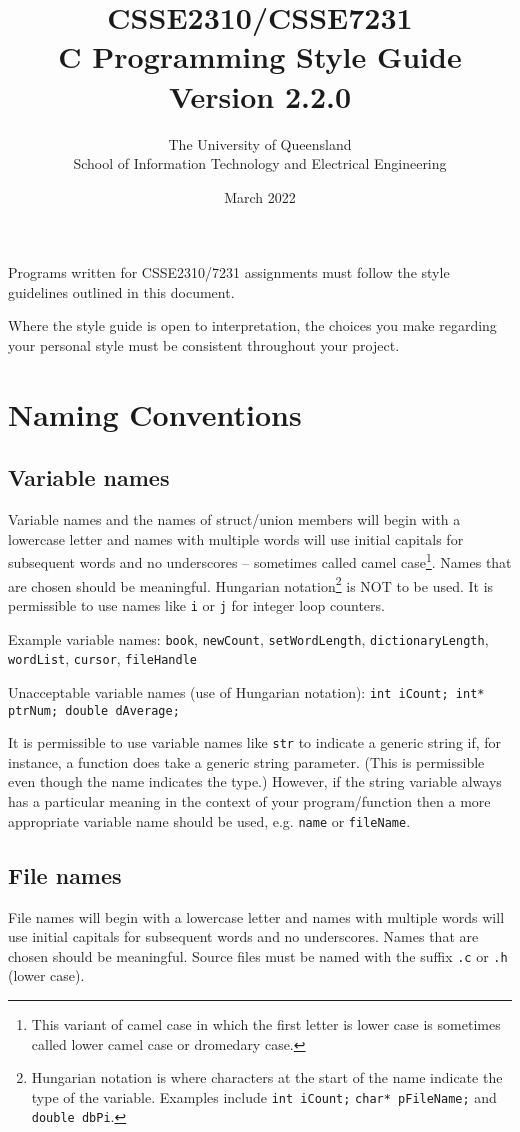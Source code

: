 \documentclass{article}
\title{CSSE2310/CSSE7231\\C Programming Style Guide\\Version 2.2.0}
\author{The University of Queensland\\School of Information Technology and Electrical Engineering}
\date{March 2022}
\begin{document}
\maketitle

Programs written for CSSE2310/7231 assignments must follow the style guidelines outlined in this document.

Where the style guide is open to interpretation, the choices you make regarding your personal style 
must be consistent throughout your project.

\section{Naming Conventions}
\subsection{Variable names}
\label{sec:naming-variable}
Variable names and the names of struct/union members will begin with a lowercase letter and names with multiple words 
will use initial capitals for subsequent words and no underscores -- sometimes called camel case\footnote{This variant of camel case 
in which the first letter is lower case is sometimes called lower camel case or dromedary case.}. 
Names that are chosen should be meaningful. Hungarian notation\footnote{Hungarian notation is where characters at the start of 
the name indicate the type of the variable. Examples include \texttt{int iCount;} \texttt{char* pFileName;} and
\texttt{double dbPi}.}
 is NOT to be used.
It is permissible to use names like \texttt{i} or \texttt{j} for integer loop counters.

Example variable names: \texttt{book}, \texttt{newCount}, \texttt{setWordLength}, \texttt{dictionaryLength}, 
\texttt{wordList}, \texttt{cursor}, \texttt{fileHandle}

Unacceptable variable names (use of Hungarian notation): \texttt{int iCount; int* ptrNum; double dAverage;}

It is permissible to use variable names like \texttt{str} to indicate a generic string if, for instance, a function does take a generic
string parameter. (This is permissible even though the name indicates the type.) However, if the string variable always has a particular meaning in the context of your program/function then a more appropriate variable name should
be used, e.g. \texttt{name} or \texttt{fileName}.
\subsection{File names}
\label{sec:naming-files}
File names will begin with a lowercase letter and names with multiple words 
will use initial capitals for subsequent words and no underscores. 
Names that are chosen should be meaningful. Source files must be named with the suffix \texttt{.c} or \texttt{.h} (lower case).
\end{document}
